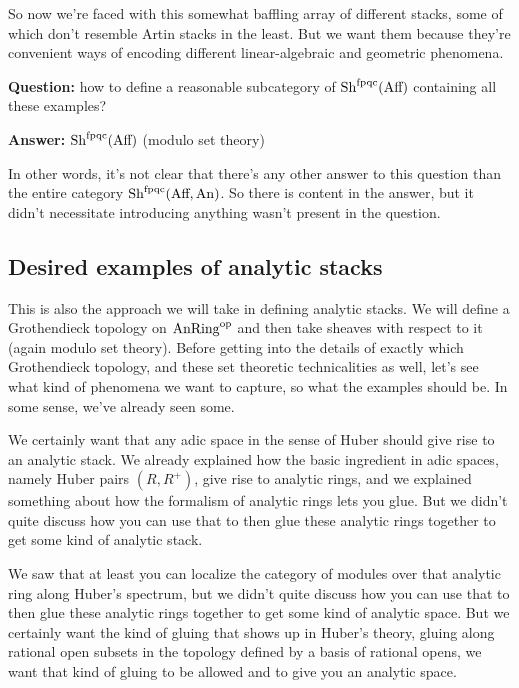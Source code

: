 So now we're faced with this somewhat baffling array of different stacks, some of which don't resemble Artin stacks in the least. But we want them because they're convenient ways of encoding different linear-algebraic and geometric phenomena. 

\textbf{Question:} how to define a reasonable subcategory of $\operatorname{Sh}^{\mathrm{fpqc}}(\text{Aff})$ containing all these examples?

\textbf{Answer:} $\operatorname{Sh}^{\mathrm{fpqc}}(\text{Aff})$ (modulo set theory)

In other words, it's not clear that there's any other answer to this question than the entire category $\operatorname{Sh}^{\mathrm{fpqc}}(\text{Aff},\mathrm{An})$. So there is content in the answer, but it didn't necessitate introducing anything wasn't present in the question. 

\subsection{Desired examples of analytic stacks}
This is also the approach we will take in defining analytic stacks. We will define a Grothendieck topology on $\mathrm{AnRing}^{\mathrm{op}}$ and then take sheaves with respect to it (again modulo set theory). Before getting into the details of exactly which Grothendieck topology, and these set theoretic technicalities as well, let's see what kind of phenomena we want to capture, so what the examples should be. In some sense, we've already seen some.

\begin{example}
  We certainly want that any adic space in the sense of Huber should give rise to an analytic stack. We already explained how the basic ingredient in adic spaces, namely Huber pairs $(R,R^+)$, give rise to analytic rings, and we explained something about how the formalism of analytic rings lets you glue. But we didn't quite discuss how you can use that to then glue these analytic rings together to get some kind of analytic stack.

  We saw that at least you can localize the category of modules over that analytic ring along Huber's spectrum, but we didn't quite discuss how you can use that to then glue these analytic rings together to get some kind of analytic space. But we certainly want the kind of gluing that shows up in Huber's theory, gluing along rational open subsets in the topology defined by a basis of rational opens, we want that kind of gluing to be allowed and to give you an analytic space.
\end{example}
  
